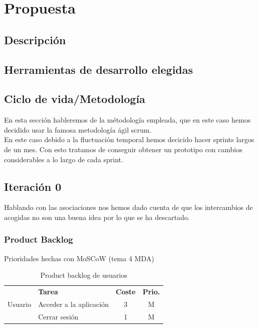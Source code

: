 \section{Propuesta}

\subsection{Descripción}

\subsection{Herramientas de desarrollo elegidas}

\subsection{Ciclo de vida/Metodología}
En esta sección hableremos de la métodología empleada, que en este caso hemos decidido usar la famosa metodología ágil scrum. \\

En este caso debido a la fluctuación temporal hemos decicido hacer sprints largos de un mes. Con esto tratamos de conseguir obtener un prototipo con cambios considerables a lo largo de cada sprint.


\subsection{Iteración 0}

Hablando con las asociaciones nos hemos dado cuenta de que los intercambios de acogidas no son una buena idea por lo que se ha descartado. \\
\subsubsection{Product Backlog}
Prioridades hechas con MoSCoW (tema 4 MDA)
\begin{table}[H]
    \centering
    \begin{tabular}{|c |p{8cm}|c |c|} \hline 
         \multirow[c]{3}{*}{Usuario}&  \textbf{Tarea}&  \textbf{Coste}& \textbf{Prio.}\\  \cline{2-4}%
         &  Acceder a la aplicación&  3& M\\ \cline{2-4} 
         &  Cerrar sesión&  1& M\\ \hline 
    \end{tabular}
    \caption{Product backlog de usuarios}
    \label{tab:pb_usuarios}
\end{table}

